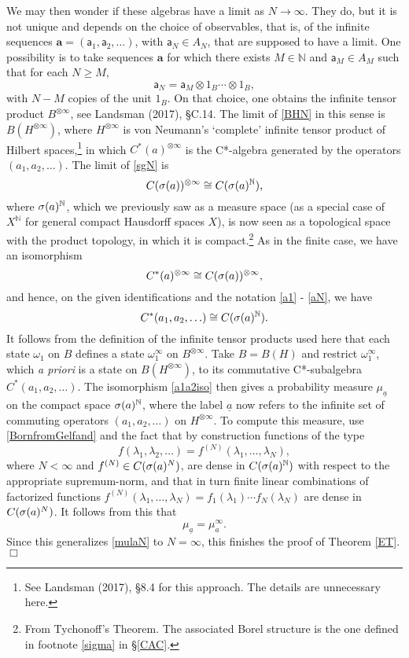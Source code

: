 \documentclass[12pt]{article}
\numberwithin{equation}{section}
\newcommand{\er}{\eqref}
\newcommand{\beq}{\begin{equation}}
\newcommand{\eeq}{\end{equation}}
\newcommand{\ul}{\underline}
\newcommand{\raw}{\rightarrow}
\newcommand{\ot}{\otimes}
\newcommand{\Hs}{Hilbert space} \newcommand{\Bs}{Banach space}
\newcommand{\lm}{\lambda} \newcommand{\Lm}{\Lambda}
\newcommand{\om}{\omega} \newcommand{\Om}{\Omega}
\newcommand{\N}{{\mathbb N}} \newcommand{\R}{{\mathbb R}}
\begin{document}
 We may then wonder if these algebras have a limit as $N\raw\infty$. They do, but it is not unique and depends on the choice of observables, that is, of the infinite sequences $\mathbf{a}=(\mathsf{a}_1,\mathsf{a}_2, \ldots)$, with $\mathsf{a}_N\in A_N$, that are supposed to have a limit. One possibility is to take sequences $\mathbf{a}$ for which  there exists $M\in\N$ and $\mathsf{a}_M\in A_M$ such that for each $N\geq M$,
\beq
\mathsf{a}_N=\mathsf{a}_M \ot 1_B\cdots\ot 1_B, \label{anam}
\eeq
 with $N-M$ copies of the unit $1_B$. On that choice, one obtains the infinite tensor product $B^{\ot\infty}$, see Landsman (2017), \S C.14. The limit of \er{BHN} in this sense is $B(H^{\ot\infty})$, where $H^{\ot\infty}$ is von Neumann's `complete' infinite tensor product of \Hs s,\footnote{See Landsman (2017), \S 8.4 for this approach. The details are unnecessary here.}  
in which $C^*(a)^{\ot\infty}$ is the C*-algebra generated by the operators $(a_1,a_2, \ldots)$. 
 The limit of \er{sgN} is 
 \begin{equation}
C(\sg(a))^{\ot \infty}\cong C(\sg(a)^{\N}), 
\end{equation}
where $\sg(a)^{\N}$, which we previously  saw as a measure space (as a special case of $X^{\N}$ for general compact Hausdorff spaces $X$), is now seen as a topological space with the product  topology, in which it is compact.\footnote{From Tychonoff's Theorem. The associated Borel structure is the one defined in footnote \ref{sigma} in \S\ref{CAC}.} As in the finite case, we  have an isomorphism
\begin{equation}
C^*(a)^{\ot\infty}
\cong C(\sg(a))^{\ot \infty},
\end{equation}
and hence, on the given identifications and the notation \er{a1} - \er{aN}, we have
\begin{equation}
C^*(a_1, a_2, \ldots)\cong C(\sg(a)^{\N}). \label{a1a2iso}
\end{equation}
It follows from the definition of the infinite tensor products used here that each state $\om_1$ on $B$ defines a state
$\om_1^{\infty}$ on $B^{\ot\infty}$. Take $B=B(H)$ and restrict $\om_1^{\infty}$, which \emph{a priori} is a state on $B(H^{\ot\infty})$, to its commutative C*-subalgebra $C^*(a_1, a_2, \ldots)$. The isomorphism \er{a1a2iso} then gives a probability measure $\mu_{\ul{a}}$ on the compact space $\sg(a)^{\N}$, where the label $\ul{a}$ now refers to the infinite set of commuting operators $(a_1, a_2, \ldots)$ on $H^{\ot\infty}$. To compute this measure, use  \er{BornfromGelfand} and the fact that by construction functions of the type
\beq
f(\lm_1, \lm_2, \ldots)=f^{(N)}(\lm_1, \ldots, \lm_N),
\eeq  
 where $N<\infty$ and $f^{(N)}\in C(\sigma(a)^N)$, are dense in $C(\sg(a)^{\N})$ with respect to the appropriate supremum-norm, and that in turn finite linear combinations of factorized functions $f^{(N)}(\lm_1, \ldots, \lm_N)=f_1(\lm_1)\cdots f_N(\lm_N)$ are dense in $C(\sigma(a)^{N})$. 
 It follows from this that 
 \beq
 \mu_{\ul{a}}=\mu_a^{\infty}. \label{mula}
 \eeq
 Since this generalizes \er{mulaN} to $N=\infty$, 
 this finishes the proof of Theorem \ref{ET}. \hfill $\Box$
\end{document}
